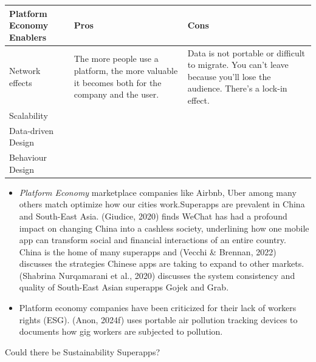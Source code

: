 \documentclass[
  letterpaper,
  DIV=11,
  numbers=noendperiod]{scrartcl}
\begin{document}
\begin{longtable}[]{@{}
  >{\raggedright\arraybackslash}p{}
  >{\raggedright\arraybackslash}p{}
  >{\raggedright\arraybackslash}p{}@{}}
\toprule\noalign{}
\begin{minipage}[b]{\linewidth}\raggedright
Platform Economy Enablers
\end{minipage} & \begin{minipage}[b]{\linewidth}\raggedright
Pros
\end{minipage} & \begin{minipage}[b]{\linewidth}\raggedright
Cons
\end{minipage} \\
\midrule\noalign{}
\endhead
\bottomrule\noalign{}
\endlastfoot
Network effects & The more people use a platform, the more valuable it
becomes both for the company and the user. & Data is not portable or
difficult to migrate. You can't leave because you'll lose the audience.
There's a lock-in effect. \\
Scalability & & \\
Data-driven Design & & \\
Behaviour Design & & \\
\end{longtable}

\begin{itemize}
\item
  \emph{Platform Economy} marketplace companies like Airbnb, Uber among
  many others match optimize how our cities work.Superapps are prevalent
  in China and South-East Asia. (Giudice, 2020) finds WeChat has had a
  profound impact on changing China into a cashless society, underlining
  how one mobile app can transform social and financial interactions of
  an entire country. China is the home of many superapps and (Vecchi \&
  Brennan, 2022) discusses the strategies Chinese apps are taking to
  expand to other markets. (Shabrina Nurqamarani et al., 2020) discusses
  the system consistency and quality of South-East Asian superapps Gojek
  and Grab.
\item
  Platform economy companies have been criticized for their lack of
  workers rights (ESG). (Anon, 2024f) uses portable air pollution
  tracking devices to documents how gig workers are subjected to
  pollution.
\end{itemize}

Could there be Sustainability Superapps?
\end{document}
